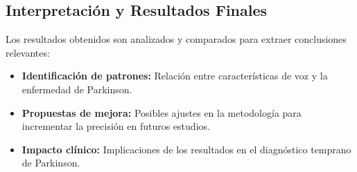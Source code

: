 \documentclass[listof=nochaptergap,12pt,times,authoryear]{report}
\begin{document}
\subsection{Interpretación y Resultados Finales}
Los resultados obtenidos son analizados y comparados para extraer conclusiones relevantes:
\begin{itemize}
    \item \textbf{Identificación de patrones:} Relación entre características de voz y la enfermedad de Parkinson.
    \item \textbf{Propuestas de mejora:} Posibles ajustes en la metodología para incrementar la precisión en futuros estudios.
    \item \textbf{Impacto clínico:} Implicaciones de los resultados en el diagnóstico temprano de Parkinson.
\end{itemize}
\end{document}
